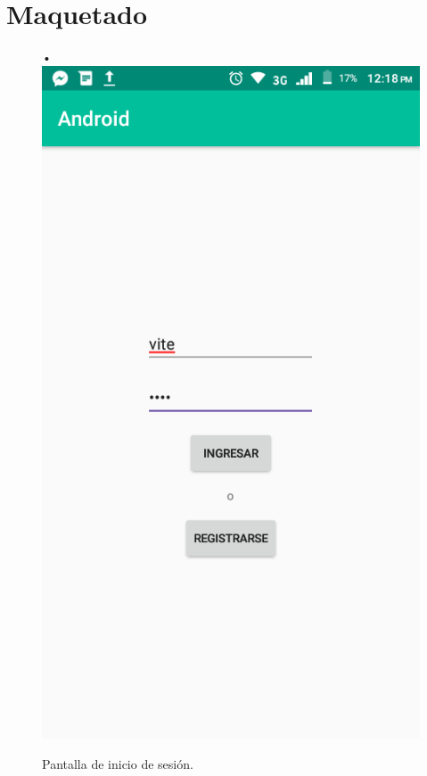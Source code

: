 \chapter{Maquetado}
\begin{center}
\begin{figure}
•\includegraphics[scale=0.3]{img/1.png} 
\caption{Pantalla de inicio de sesión.}
\end{figure}
\end{center}

